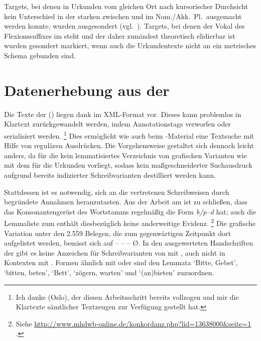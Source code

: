 Targets, bei denen in Urkunden vom gleichen Ort nach kursorischer Durchsicht
kein Unterschied in der starken  zwischen 
und  im Nom./Akk.~Pl.\ ausgemacht werden konnte, wurden ausgesondert
(vgl.~). Targets, bei denen der Vokal des
Flexionssuffixes im  steht und der daher zumindest theoretisch
elidierbar ist \autocites[vgl.][90--91]{askedal1973}[191]{gjelsten1980} wurden
gesondert markiert, wenn auch die Urkundentexte nicht an ein metrisches Schema
gebunden sind.


\section{Datenerhebung aus der }

Die Texte der  (\KC) liegen dank 
\autocite{kcdigital} im XML-Format vor. Dieses kann problemlos in Klartext
zurückgewandelt werden, indem Annotationstags verworfen oder
serialisiert werden.%
%
	\footnote{Ich danke  (Oslo), der diesen
	Arbeitsschritt bereits vollzogen und mir die Klartexte sämtlicher
	Textzeugen zur Verfügung gestellt hat.}
%
Dies ermöglicht wie auch beim \CAO{}-Material eine Textsuche mit Hilfe von
regulären Ausdrücken. Die Vorgehensweise gestaltet sich dennoch leicht anders,
da für die \KC{} kein lemmatisiertes Verzeichnis von grafischen Varianten wie
mit dem \WMU{} für die Urkunden vorliegt, sodass kein maßgeschneiderter
Suchausdruck aufgrund bereits indizierter Schreibvarianten destilliert werden
kann.

Stattdessen ist es notwendig, sich an die vertretenen Schreibweisen durch
begründete Annahmen heranzutasten. Aus der Arbeit am \CAO{} ist zu schließen,
dass das Konsonantengerüst des Wortstamms regelmäßig die Form \textit{b/p--d}
hat; auch die Lemmaliste zum  \autocite[s.\,v.~]{mwb1} enthält diesbezüglich keine
anderweitige Evidenz.%
%
	\footnote{Siehe
		\url{http://www.mhdwb-online.de/konkordanz.php?lid=13638000&seite=1}%
		.}
%
Die grafische Variation unter den 2.559 Belegen, die zum gegenwärtigen
Zeitpunkt dort aufgelistet werden, bemisst sich auf  --  --  --  Ø. In den ausgewerteten Handschriften der \KC{} gibt
es keine Anzeichen für Schreibvarianten von  mit , auch
nicht in Kontexten mit . Formen ähnlich  mit 
oder  sind den Lemmata  `Bitte, Gebet', 
`bitten, beten',  `Bett',  `zögern, warten' und
 `(an)bieten' zuzuordnen.

